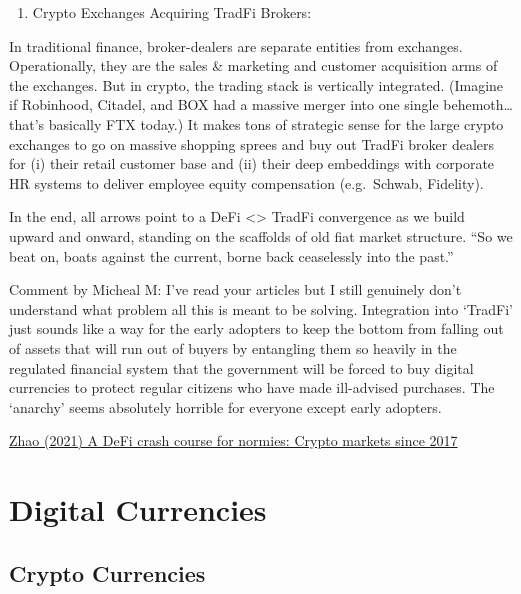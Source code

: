 \documentclass[
]{book}
\providecommand{\tightlist}{%
  \setlength{\itemsep}{0pt}\setlength{\parskip}{0pt}}
\begin{document}
\begin{enumerate}
\def\labelenumi{(\alph{enumi})}
\setcounter{enumi}{3}
\tightlist
\item
  Crypto Exchanges Acquiring TradFi Brokers:
\end{enumerate}

In traditional finance, broker-dealers are separate entities from exchanges. Operationally, they are the sales \& marketing and customer acquisition arms of the exchanges. But in crypto, the trading stack is vertically integrated. (Imagine if Robinhood, Citadel, and BOX had a massive merger into one single behemoth\ldots{} that's basically FTX today.) It makes tons of strategic sense for the large crypto exchanges to go on massive shopping sprees and buy out TradFi broker dealers for (i) their retail customer base and (ii) their deep embeddings with corporate HR systems to deliver employee equity compensation (e.g.~Schwab, Fidelity).

In the end, all arrows point to a DeFi \textless\textgreater{} TradFi convergence as we build upward and onward, standing on the scaffolds of old fiat market structure. ``So we beat on, boats against the current, borne back ceaselessly into the past.''

Comment by Micheal M:
I've read your articles but I still genuinely don't understand what problem all this is meant to be solving. Integration into `TradFi' just sounds like a way for the early adopters to keep the bottom from falling out of assets that will run out of buyers by entangling them so heavily in the regulated financial system that the government will be forced to buy digital currencies to protect regular citizens who have made ill-advised purchases. The `anarchy' seems absolutely horrible for everyone except early adopters.

\href{https://noahpinion.substack.com/p/a-defi-crash-course-for-normies-crypto}{Zhao (2021) A DeFi crash course for normies: Crypto markets since 2017}

\hypertarget{digital-currencies}{%
\chapter{Digital Currencies}\label{digital-currencies}}

\hypertarget{crypto-currencies}{%
\section{Crypto Currencies}\label{crypto-currencies}}
\end{document}
